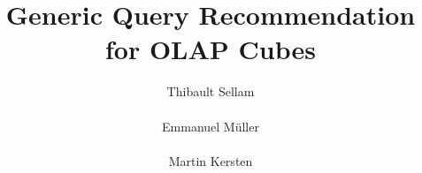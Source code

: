 \documentclass{acm_proc_article-sp}
\begin{document}
\title{Generic Query Recommendation for OLAP Cubes}

\author{
\alignauthor
Thibault Sellam\\
       \\
\alignauthor
Emmanuel M\"uller\\
       \\
\alignauthor
Martin Kersten\\
       \\
}

\maketitle










  
\balancecolumns
\end{document}
